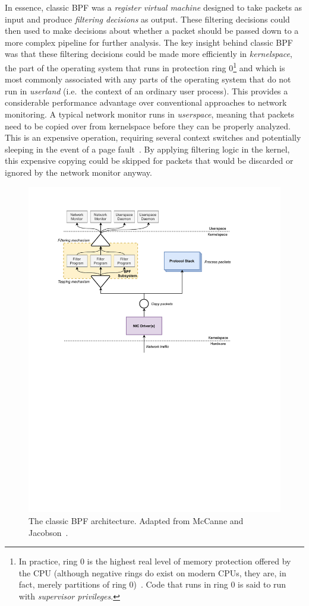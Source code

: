 In essence, classic BPF was a \textit{register virtual machine} designed to take packets
as input and produce \textit{filtering decisions} as output. These filtering decisions
could then used to make decisions about whether a packet should be passed down to a more
complex pipeline for further analysis. The key insight behind classic BPF was that these
filtering decisions could be made more efficiently in \textit{kernelspace}, the part of
the operating system that runs in protection ring 0\footnote{In practice, ring 0 is the
highest real level of memory protection offered by the CPU (although negative rings do
exist on modern CPUs, they are, in fact, merely partitions of ring 0)~. Code
that runs in ring 0 is said to run with \textit{supervisor privileges}.} and which is most
commonly associated with any parts of the operating system that do not run in
\textit{userland} (i.e.~the context of an ordinary user process). This provides
a considerable performance advantage over conventional approaches to network monitoring.
A typical network monitor runs in \textit{userspace}, meaning that packets need to be
copied over from kernelspace before they can be properly analyzed. This is an expensive
operation, requiring several context switches and potentially sleeping in the event of
a page fault~\cite{mccanne1993_bpf}. By applying filtering logic in the kernel, this
expensive copying could be skipped for packets that would be discarded or ignored by the
network monitor anyway.

\begin{figure}[htb!]
  \centering
  \includegraphics[width=0.8\linewidth]{figs/background/classic-bpf.pdf}
  \caption[The classic BPF architecture]{The classic BPF architecture. Adapted from McCanne and Jacobson~\cite{mccanne1993_bpf}.}%
  \label{fig:classic-bpf}
\end{figure}

